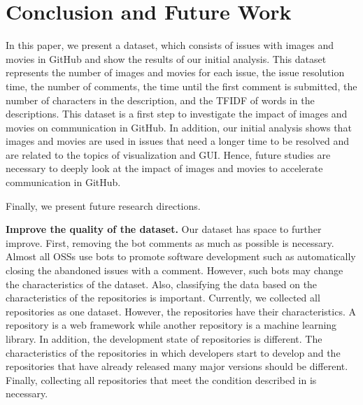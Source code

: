 \section{Conclusion and Future Work}
\label{sec:conclusion}

In this paper, we present a dataset, 
which consists of issues with images and movies 
in GitHub and show the results of our initial analysis. 
This dataset represents the number of images and movies 
for each issue, 
the issue resolution time, 
the number of comments, 
the time until the first comment is submitted, 
the number of characters in the description, 
and the TFIDF of words in the descriptions. 
This dataset is a first step to investigate 
the impact of images and movies on communication in GitHub. 
In addition, our initial analysis shows that images and movies 
are used in issues that need a longer time to be resolved and 
are related to the topics of visualization and GUI. 
Hence, future studies are necessary to deeply look at 
the impact of images and movies to accelerate communication 
in GitHub.

Finally, we present future research directions. 

\noindent
\textbf{Improve the quality of the dataset.}
Our dataset has space to further improve.
First, removing the bot comments as much as 
possible is necessary. 
Almost all OSSs use bots to promote software development 
such as automatically closing the abandoned issues with 
a comment. 
However, such bots may change the characteristics of 
the dataset. 
Also, classifying the data based on 
the characteristics of the repositories is important. 
Currently, we collected all repositories as one dataset. 
However, the repositories have their characteristics. 
A repository is a web framework while another repository is 
a machine learning library. 
In addition, the development state of repositories is different. 
The characteristics of the repositories in which 
developers start to develop and the repositories that 
have already released many major versions should be different. 
Finally, collecting all repositories that meet 
the condition described in  is necessary. 


